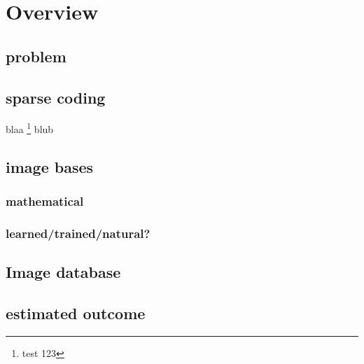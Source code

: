 \chapter{Overview}


\section{problem}


\section{sparse coding}
blaa \footnote{test 123} blub

\section{image bases}
\subsection{mathematical}
\subsection{learned/trained/natural?}
\label{•} 

\section{Image database}


\section{estimated outcome}
